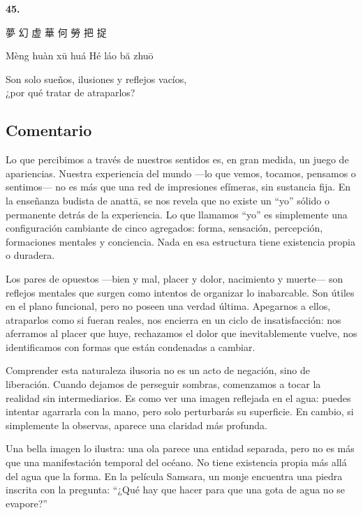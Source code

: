 \documentclass[
  a5paperpaper,
]{article}
\begin{document}
\hypertarget{05}{}
\begin{verseblock}

\newpage

\begin{center}\textbf{45.}\end{center}

夢 幻 虚 華 何 勞 把 捉

Mèng huàn xū huá Hé láo bă zhuō

Son solo sueños, ilusiones y reflejos vacíos,\\
¿por qué tratar de atraparlos?

\end{verseblock}

\hfill\break

\hypertarget{comentario-44}{%
\subsection{Comentario}\label{comentario-44}}

Lo que percibimos a través de nuestros sentidos es, en gran medida, un
juego de apariencias. Nuestra experiencia del mundo ---lo que vemos,
tocamos, pensamos o sentimos--- no es más que una red de impresiones
efímeras, sin sustancia fija. En la enseñanza budista de anattā, se nos
revela que no existe un ``yo'' sólido o permanente detrás de la
experiencia. Lo que llamamos ``yo'' es simplemente una configuración
cambiante de cinco agregados: forma, sensación, percepción, formaciones
mentales y conciencia. Nada en esa estructura tiene existencia propia o
duradera.

Los pares de opuestos ---bien y mal, placer y dolor, nacimiento y
muerte--- son reflejos mentales que surgen como intentos de organizar lo
inabarcable. Son útiles en el plano funcional, pero no poseen una verdad
última. Apegarnos a ellos, atraparlos como si fueran reales, nos
encierra en un ciclo de insatisfacción: nos aferramos al placer que
huye, rechazamos el dolor que inevitablemente vuelve, nos identificamos
con formas que están condenadas a cambiar.

Comprender esta naturaleza ilusoria no es un acto de negación, sino de
liberación. Cuando dejamos de perseguir sombras, comenzamos a tocar la
realidad sin intermediarios. Es como ver una imagen reflejada en el
agua: puedes intentar agarrarla con la mano, pero solo perturbarás su
superficie. En cambio, si simplemente la observas, aparece una claridad
más profunda.

Una bella imagen lo ilustra: una ola parece una entidad separada, pero
no es más que una manifestación temporal del océano. No tiene existencia
propia más allá del agua que la forma. En la película Samsara, un monje
encuentra una piedra inscrita con la pregunta: ``¿Qué hay que hacer para
que una gota de agua no se evapore?''
\end{document}
